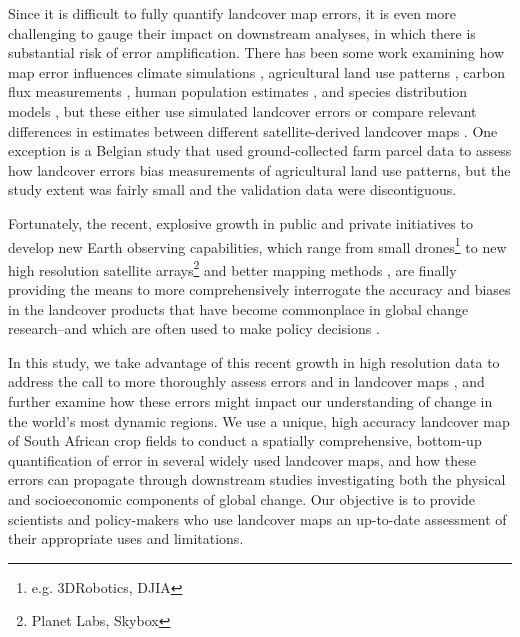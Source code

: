 \documentclass{pnastwo}
\begin{document}
\begin{article}

Since it is difficult to fully quantify landcover map errors, it is even more challenging to gauge their impact on downstream analyses, in which there is substantial risk of error amplification\cite{kuemmerle_challenges_2013}. There has been some work examining how map error influences climate simulations \cite{ge_impacts_2007}, agricultural land use patterns \cite{schmit_limitations_2006}, carbon flux measurements \cite{quaife_impact_2008}, human population estimates \cite{linard_assessing_2010}, and species distribution models \cite{tuanmu_global_2014}, but these either use simulated landcover errors \cite{ge_impacts_2007} or compare relevant differences in estimates between different satellite-derived landcover maps \cite{linard_assessing_2010, quaife_impact_2008,tuanmu_global_2014}. One exception is a Belgian study \cite{schmit_limitations_2006} that used ground-collected farm parcel data to assess how landcover errors bias measurements of agricultural land use patterns, but the study extent was fairly small and the validation data were discontiguous. 

Fortunately, the recent, explosive growth in public and private initiatives to develop new Earth observing capabilities, which range from small drones\footnote{e.g. 3DRobotics, DJIA} to new high resolution satellite arrays\footnote{Planet Labs, Skybox} and better mapping methods \cite{fritz_geo-wiki:_2012,estes_projected_2013, debats_generalized_2015}, are finally providing the means to more comprehensively interrogate the accuracy and biases in the landcover products that have become commonplace in global change research--and which are often used to make policy decisions \cite{searchinger_high_2015}.  

In this study, we take advantage of this recent growth in high resolution data to address the call to more thoroughly assess errors and in landcover maps \cite{kuemmerle_challenges_2013, olofsson_good_2014,olofsson_global_2012}, and further examine how these errors might impact our understanding of change in the world's most dynamic regions.  We use a unique, high accuracy landcover map of South African crop fields to conduct a spatially comprehensive, bottom-up quantification of error in several widely used landcover maps, and how these errors can propagate through downstream studies investigating both the physical and socioeconomic components of global change. Our objective is to provide scientists and policy-makers who use landcover maps an up-to-date assessment of their appropriate uses and limitations. 


\end{article}
\end{document}
